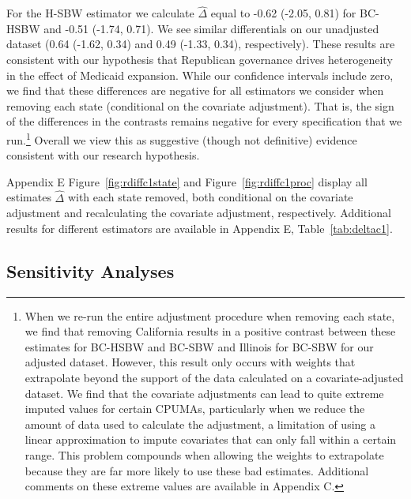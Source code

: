 \documentclass[12pt]{article}
\begin{document}
For the H-SBW estimator we calculate $\hat{\Delta}$ equal to -0.62 (-2.05, 0.81) for BC-HSBW and -0.51 (-1.74, 0.71). We see similar differentials on our unadjusted dataset (0.64 (-1.62, 0.34) and 0.49 (-1.33, 0.34), respectively). These results are consistent with our hypothesis that Republican governance drives heterogeneity in the effect of Medicaid expansion. While our confidence intervals include zero, we find that these differences are negative for all estimators we consider when removing each state (conditional on the covariate adjustment). That is, the sign of the differences in the contrasts remains negative for every specification that we run.\footnote{When we re-run the entire adjustment procedure when removing each state, we find that removing California results in a positive contrast between these estimates for BC-HSBW and BC-SBW and Illinois for BC-SBW for our adjusted dataset. However, this result only occurs with weights that extrapolate beyond the support of the data calculated on a covariate-adjusted dataset. We find that the covariate adjustments can lead to quite extreme imputed values for certain CPUMAs, particularly when we reduce the amount of data used to calculate the adjustment, a limitation of using a linear approximation to impute covariates that can only fall within a certain range. This problem compounds when allowing the weights to extrapolate because they are far more likely to use these bad estimates. Additional comments on these extreme values are available in Appendix C.} Overall we view this as suggestive (though not definitive) evidence consistent with our research hypothesis.

Appendix E Figure~\ref{fig:rdiffc1state} and Figure~\ref{fig:rdiffc1proc} display all estimates $\hat{\Delta}$ with each state removed, both conditional on the covariate adjustment and recalculating the covariate adjustment, respectively. Additional results for different estimators are available in Appendix E, Table~\ref{tab:deltac1}.

\subsection{Sensitivity Analyses} \label{sssec:sensitivity}
\end{document}
